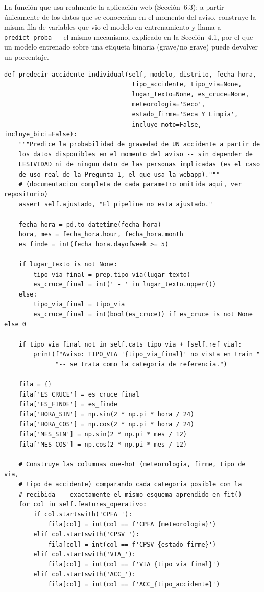 \documentclass[11pt,a4paper]{article}
\begin{document}
La función que usa realmente la aplicación web (Sección~6.3): a partir únicamente de los datos que se conocerían en el momento del aviso, construye la misma fila de variables que vio el modelo en entrenamiento y llama a \texttt{predict\_proba} --- el mismo mecanismo, explicado en la Sección~4.1, por el que un modelo entrenado sobre una etiqueta binaria (grave/no grave) puede devolver un porcentaje.

\begin{lstlisting}[caption={Predicción de la probabilidad de gravedad de un accidente individual, a partir de los datos disponibles en el momento del aviso.}]
def predecir_accidente_individual(self, modelo, distrito, fecha_hora,
                                   tipo_accidente, tipo_via=None,
                                   lugar_texto=None, es_cruce=None,
                                   meteorologia='Seco',
                                   estado_firme='Seca Y Limpia',
                                   incluye_moto=False, incluye_bici=False):
    """Predice la probabilidad de gravedad de UN accidente a partir de
    los datos disponibles en el momento del aviso -- sin depender de
    LESIVIDAD ni de ningun dato de las personas implicadas (es el caso
    de uso real de la Pregunta 1, el que usa la webapp)."""
    # (documentacion completa de cada parametro omitida aqui, ver repositorio)
    assert self.ajustado, "El pipeline no esta ajustado."

    fecha_hora = pd.to_datetime(fecha_hora)
    hora, mes = fecha_hora.hour, fecha_hora.month
    es_finde = int(fecha_hora.dayofweek >= 5)

    if lugar_texto is not None:
        tipo_via_final = prep.tipo_via(lugar_texto)
        es_cruce_final = int(' - ' in lugar_texto.upper())
    else:
        tipo_via_final = tipo_via
        es_cruce_final = int(bool(es_cruce)) if es_cruce is not None else 0

    if tipo_via_final not in self.cats_tipo_via + [self.ref_via]:
        print(f"Aviso: TIPO_VIA '{tipo_via_final}' no vista en train "
              "-- se trata como la categoria de referencia.")

    fila = {}
    fila['ES_CRUCE'] = es_cruce_final
    fila['ES_FINDE'] = es_finde
    fila['HORA_SIN'] = np.sin(2 * np.pi * hora / 24)
    fila['HORA_COS'] = np.cos(2 * np.pi * hora / 24)
    fila['MES_SIN'] = np.sin(2 * np.pi * mes / 12)
    fila['MES_COS'] = np.cos(2 * np.pi * mes / 12)

    # Construye las columnas one-hot (meteorologia, firme, tipo de via,
    # tipo de accidente) comparando cada categoria posible con la
    # recibida -- exactamente el mismo esquema aprendido en fit()
    for col in self.features_operativo:
        if col.startswith('CPFA '):
            fila[col] = int(col == f'CPFA {meteorologia}')
        elif col.startswith('CPSV '):
            fila[col] = int(col == f'CPSV {estado_firme}')
        elif col.startswith('VIA_'):
            fila[col] = int(col == f'VIA_{tipo_via_final}')
        elif col.startswith('ACC_'):
            fila[col] = int(col == f'ACC_{tipo_accidente}')


\end{lstlisting}
\end{document}
